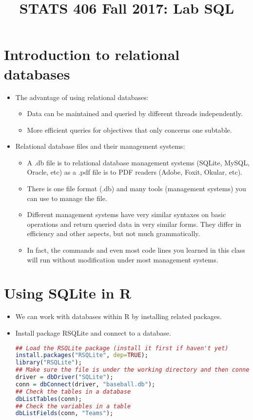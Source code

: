 \documentclass[12pt]{article}
\begin{document}
\title{\Large \bf STATS 406 Fall 2017: Lab SQL}
\date{}

\maketitle

\section{Introduction to relational databases}
\begin{itemize}
	\item The advantage of using relational databases:
	\begin{itemize}[label=*]
		\item Data can be maintained and queried by different threads independently.
		\item More efficient queries for objectives that only concerns one subtable.
	\end{itemize}
	\item Relational database files and their management systems:
	\begin{itemize}[label=*]
		\item A .db file is to relational database management systems (SQLite, MySQL, Oracle, etc) as a .pdf file is to PDF readers (Adobe, Foxit, Okular, etc).
		\item There is one file format (.db) and many tools (management systems) you can use to manage the file.
		\item Different management systems have very similar syntaxes on basic operations and return queried data in very similar forms. They differ in efficiency and other aspects, but not much grammatically.
		\item In fact, the commands and even most code lines you learned in this class will run without modification under most management systems.
	\end{itemize}
\end{itemize}

\section{Using SQLite in R}
\begin{itemize}
	\item We can work with databases within R by installing related packages.
	\item Install package RSQLite and connect to a database.
\begin{lstlisting}[style=displaycode, language=R]
## Load the RSQLite package (install it first if haven't yet)
install.packages("RSQLite", dep=TRUE);
library("RSQLite");
## Make sure the file is under the working directory and then connect to it
driver = dbDriver("SQLite");
conn = dbConnect(driver, "baseball.db");
## Check the tables in a database
dbListTables(conn);
## Check the variables in a table
dbListFields(conn, "Teams");
\end{lstlisting}

\end{itemize}
\end{document}
